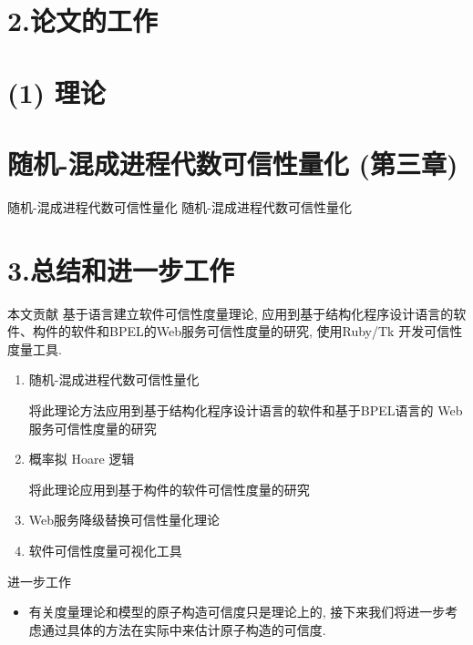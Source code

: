 \documentclass[												
size=10pt,															
paper=screen,														
mode=present,														
orient=landscape,
clock=true,															
style=chenandwu		
]{powerdot}
\begin{document}
\begin{CJK*}{GBK}{song}
\section{2.论文的工作}	
\section{\quad (1) 理论}
\section{\qquad 随机-混成进程代数可信性量化 (第三章)}
\begin{slide}{随机-混成进程代数可信性量化}
随机-混成进程代数可信性量化
\end{slide}
\section{3.总结和进一步工作}
\begin{slide}{本文贡献}
基于语言建立软件可信性度量\textcolor[rgb]{0.70,0.00,0.00}{理论}, \textcolor[rgb]{0.70,0.00,0.00}{应用}到基于结构化程序设计语言的软件、构件的软件和BPEL的Web服务可信性度量的研究, 使用Ruby/Tk 开发可信性度量\textcolor[rgb]{0.70,0.00,0.00}{工具}.
\begin{enumerate}
\item<2-5> 随机-混成进程代数可信性量化

将此理论方法应用到基于结构化程序设计语言的软件和基于BPEL语言的 Web 服务可信性度量的研究
\item<3-5> 概率拟 Hoare 逻辑

将此理论应用到基于构件的软件可信性度量的研究
\item<4-5> Web服务降级替换可信性量化理论
\item<5> 软件可信性度量可视化工具
\end{enumerate}
\end{slide}
\begin{slide}[method=direct]{进一步工作}
\begin{itemize}
\item 有关度量理论和模型的原子构造可信度只是理论上的, 接下来我们将进一步考虑通过具体的方法在实际中来估计原子构造的可信度.


\end{itemize}
\end{slide}
\end{CJK*}
\end{document}
